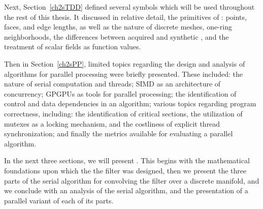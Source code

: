 Next, Section~\ref{ch2sTDD} defined several symbols which will be used throughout the rest of this thesis. It discussed in relative detail, the primitives of \tdd{}: points, faces, and edge lengths, as well as the nature of discrete meshes, one-ring neighborhoods, the differences between acquired and synthetic \tdd{}, and the treatment of scalar fields as function values.

Then in Section~\ref{ch2sPP}, limited topics regarding the design and analysis of algorithms for parallel processing were briefly presented. These included: the nature of serial computation and threads; SIMD as an architecture of concurrency; GPGPUs as tools for parallel processing; the identification of control and data dependencies in an algorithm; various topics regarding program correctness, including: the identification of critical sections, the utilization of mutexes as a locking mechanism, and the costliness of explicit thread synchronization; and finally the metrics available for evaluating a parallel algorithm.

In the next three sections, we will present . This begins with the mathematical foundations upon which the the filter was designed, then we present the three parts of the serial algorithm for convolving the filter over a discrete manifold, and we conclude with an analysis of the serial algorithm, and the presentation of a parallel variant of each of its parts.

